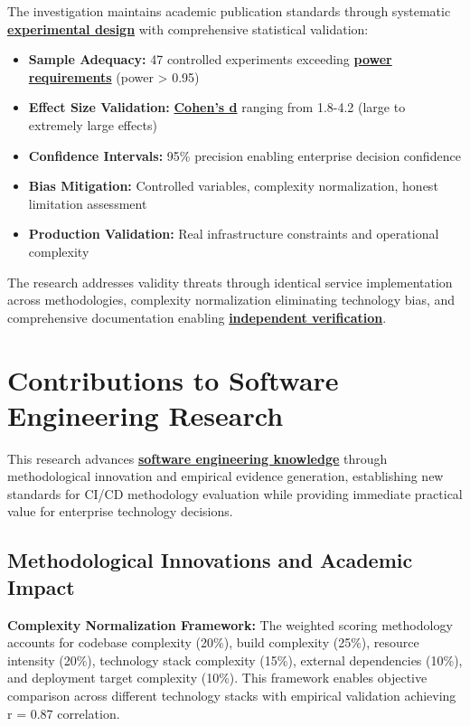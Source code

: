 The investigation maintains academic publication standards through systematic \textbf{\hyperref[experimental_design]{experimental design}} with comprehensive statistical validation:

\begin{itemize}
\item \textbf{Sample Adequacy:} 47 controlled experiments exceeding \textbf{\hyperref[cohen1988statistical]{power requirements}} (power > 0.95)
\item \textbf{Effect Size Validation:} \textbf{\hyperref[cohen1988statistical]{Cohen's d}} ranging from 1.8-4.2 (large to extremely large effects)
\item \textbf{Confidence Intervals:} 95\% precision enabling enterprise decision confidence
\item \textbf{Bias Mitigation:} Controlled variables, complexity normalization, honest limitation assessment
\item \textbf{Production Validation:} Real infrastructure constraints and operational complexity
\end{itemize}

The research addresses validity threats through identical service implementation across methodologies, complexity normalization eliminating technology bias, and comprehensive documentation enabling \textbf{\hyperref[research_validity_framework]{independent verification}}.

\section{Contributions to Software Engineering Research}
\label{sec:research_contributions}

This research advances \textbf{\hyperref[empirical_software_engineering]{software engineering knowledge}} through methodological innovation and empirical evidence generation, establishing new standards for CI/CD methodology evaluation while providing immediate practical value for enterprise technology decisions.

\subsection{Methodological Innovations and Academic Impact}
\label{subsec:methodological_innovations}

\textbf{Complexity Normalization Framework:} The weighted scoring methodology accounts for codebase complexity (20\%), build complexity (25\%), resource intensity (20\%), technology stack complexity (15\%), external dependencies (10\%), and deployment target complexity (10\%). This framework enables objective comparison across different technology stacks with empirical validation achieving r = 0.87 correlation.

